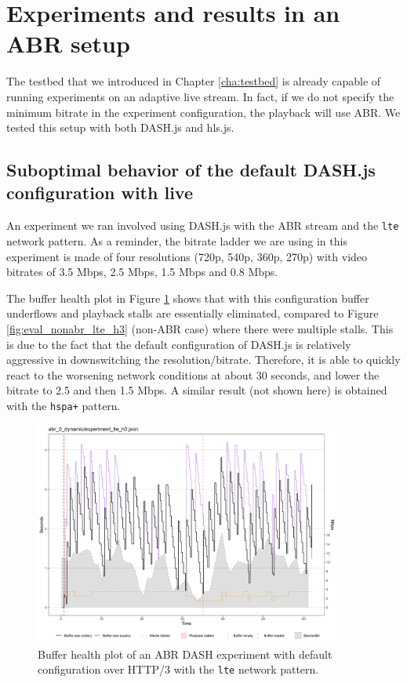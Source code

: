 \section{Experiments and results in an ABR setup}
\label{sec:eval/abr}

The testbed that we introduced in Chapter \ref{cha:testbed} is already capable of running experiments on an adaptive live stream. In fact, if we do not specify the minimum bitrate in the experiment configuration, the playback will use ABR. We tested this setup with both DASH.js and hls.js.

\subsection{Suboptimal behavior of the default DASH.js configuration with live}
\label{sec:eval/abr/dashjs}

An experiment we ran involved using DASH.js with the ABR stream and the \texttt{lte} network pattern. As a reminder, the bitrate ladder we are using in this experiment is made of four resolutions (720p, 540p, 360p, 270p) with video bitrates of 3.5 Mbps, 2.5 Mbps, 1.5 Mbps and 0.8 Mbps.

The buffer health plot in Figure \ref{fig:eval_abr_dashjs} shows that with this configuration buffer underflows and playback stalls are essentially eliminated, compared to Figure \ref{fig:eval_nonabr_lte_h3} (non-ABR case) where there were multiple stalls. This is due to the fact that the default configuration of DASH.js is relatively aggressive in downswitching the resolution/bitrate. Therefore, it is able to quickly react to the worsening network conditions at about 30 seconds, and lower the bitrate to 2.5 and then 1.5 Mbps. A similar result (not shown here) is obtained with the \texttt{hspa+} pattern.

\begin{figure}[h]
    \centering
    \includegraphics[width=0.9\textwidth]{res/eval_abr_dash_dynamic.png}
    \caption{Buffer health plot of an ABR DASH experiment with default configuration over HTTP/3 with the \texttt{lte} network pattern.}
    \label{fig:eval_abr_dashjs}
\end{figure}

